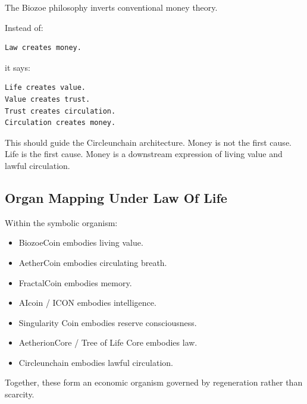 ﻿\documentclass[12pt]{article}
\begin{document}
The Biozoe philosophy inverts conventional money theory.

Instead of:

\begin{verbatim}
Law creates money.
\end{verbatim}

it says:

\begin{verbatim}
Life creates value.
Value creates trust.
Trust creates circulation.
Circulation creates money.
\end{verbatim}

This should guide the Circleunchain architecture. Money is not the first cause. Life is the first cause. Money is a downstream expression of living value and lawful circulation.

\subsection{Organ Mapping Under Law Of Life}


Within the symbolic organism:

\begin{itemize}
  \item BiozoeCoin embodies living value.
\end{itemize}
\begin{itemize}
  \item AetherCoin embodies circulating breath.
\end{itemize}
\begin{itemize}
  \item FractalCoin embodies memory.
\end{itemize}
\begin{itemize}
  \item AIcoin / ICON embodies intelligence.
\end{itemize}
\begin{itemize}
  \item Singularity Coin embodies reserve consciousness.
\end{itemize}
\begin{itemize}
  \item AetherionCore / Tree of Life Core embodies law.
\end{itemize}
\begin{itemize}
  \item Circleunchain embodies lawful circulation.
\end{itemize}

Together, these form an economic organism governed by regeneration rather than scarcity.
\end{document}
